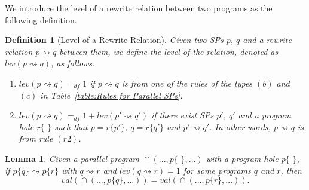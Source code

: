 \documentclass{fcs}
\newtheorem{mydef}{Definition}[section]
\newtheorem{lemma}{Lemma}[section]
\newcommand{\val}[0]{\mathit{val}}
\DeclareMathOperator{\para}{\cap}
\newcommand{\place}[0]{\_}
\newcommand{\red}[0]{\rightsquigarrow}
\newcommand{\lev}[0]{\mathit{lev}}
\newcommand{\dddef}[0]{=_{df}}
\begin{document}
We introduce the level of a rewrite relation between two programs as the following definition.
\begin{mydef}[Level of a Rewrite Relation]
\label{def:Level of a Rewrite Relation}
    Given two SPs $p$, $q$ and a rewrite relation $p\red q$ between them, we define the level of the relation, denoted as $\lev(p\red q)$, as follows:
    \begin{enumerate}
    \item $\lev(p\red q) \dddef 1$ if $p\red q$ is from one of the rules of the types $(b)$ and $(c)$ in Table~\ref{table:Rules for Parallel SPs}.
    \item $\lev(p\red q)\dddef 1 + \lev(p'\red q')$ if there exist SPs $p'$, $q'$ and a program hole $r\{\place\}$ such that $p = r\{p'\}$, $q=r\{q'\}$ and $p'\red q'$.
    In other words, $p\red q$ is from rule $(r2)$.
    \end{enumerate}
\end{mydef}

\begin{lemma}
    \label{lemma:parallel-lemma}
    Given a parallel program $\para(...,p\{\place\},...)$ with a program hole $p\{\place\}$,
    if $p\{q\}\red p\{r\}$ with $q\red r$ and $\lev(q\red r) = 1$ for some programs $q$ and $r$,
    then
    \begin{equation}
    \label{equ:parallel-lemma-1}
    \val(\para(..., p\{q\},...)) = \val(\para(...,p\{r\},...)).
    \end{equation}
\end{lemma}
\end{document}
